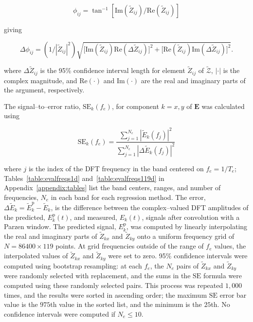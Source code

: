 \documentclass[draft,linenumbers]{agujournal2018}
\begin{document}
$$\phi_{ij}=\tan^{-1}[\text{Im}(\widetilde{Z}_{ij})/\text{Re}(\widetilde{Z}_{ij})]$$

\noindent giving

$$\Delta\phi_{ij} = (1/|\widetilde{Z}_{ij}|^2) \sqrt{ \big[\text{Im}(\widetilde{Z}_{ij})\text{Re}(\Delta \widetilde{Z}_{ij})\big]^2 + \big[\text{Re}(\widetilde{Z}_{ij})\text{Im}(\Delta \widetilde{Z}_{ij}) \big]^2}.$$

\noindent where $\Delta \widetilde{Z}_{ij}$ is the 95\% confidence interval length for element $\widetilde{Z}_{ij}$ of $\boldsymbol{\mathcal{\widetilde{Z}}}$, $|\boldsymbol{\cdotp}|$ is the complex magnitude, and $\text{Re}(\boldsymbol{\cdotp})$ and $\text{Im}(\boldsymbol{\cdotp})$ are the real and imaginary parts of the argument, respectively.




The signal--to--error ratio, $\text{SE}_k(f_e)$, for component $k=x,y$ of $\mathbf{E}$ was calculated using 

\begin{equation}
\text{SE}_k(f_e) = \frac{\displaystyle\sum_{j=1}^{N_e} \left|\widetilde{E}_k(f_j)\right|^2}{\displaystyle\sum_{j=1}^{N_e}\left|\Delta\widetilde{E}_k(f_j)\right|^2}
\end{equation}

\noindent where $j$ is the index of the DFT frequency in the band centered on $f_e=1/T_e$; Tables~\ref{table:evalfreqs1d} and~\ref{table:evalfreqs119d} in Appendix~\ref{appendix:tables} list the band centers, ranges, and number of frequencies, $N_e$ in each band for each regression method. The error, $\Delta\widetilde{E}_k = \widetilde{E}_k^{\text{p}}-\widetilde{E}_k$, is the difference between the complex--valued DFT amplitudes of the predicted, $E_k^\text{p}(t)$, and measured, $E_k(t)$, signals after convolution with a Parzen window. The predicted signal, $E_k^{\text{p}}$, was computed by linearly interpolating the real and imaginary parts of $\widetilde{Z}_{kx}$ and $\widetilde{Z}_{ky}$ onto a uniform frequency grid of $N=86400\times 119$ points. At grid frequencies outside of the range of $f_e$ values, the interpolated values of $\widetilde{Z}_{kx}$ and $\widetilde{Z}_{ky}$ were set to zero. 95\% confidence intervals were computed using bootstrap resampling: at each $f_e$, the $N_e$ pairs of $\widetilde{Z}_{kx}$ and $\widetilde{Z}_{ky}$ were randomly selected with replacement, and the sums in the $\text{SE}$ formula were computed using these randomly selected pairs. This process was repeated $1,000$ times, and the results were sorted in ascending order; the maximum $\text{SE}$ error bar value is the $975$th value in the sorted list, and the minimum is the $25$th. No confidence intervals were computed if $N_e\le 10$.
\end{document}
